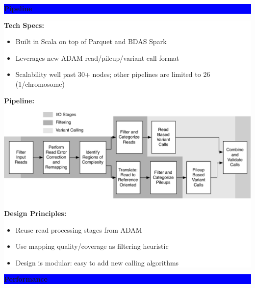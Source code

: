 \documentclass[11pt]{a0poster}
\begin{document}
{\begin{minipage}[t][2045pt][t]{\linewidth}
\begin{minipage}{0.3\linewidth}
\vspace{75pt}
\colorbox{Blue}{
\begin{minipage}{\linewidth}
\vspace{25pt}
\begin{center}
\Huge \bf \color{White} Pipeline
\end{center}
\vspace{10pt}
\end{minipage}
}
\colorbox{White}{
\begin{minipage}[t][1020pt][t]{\linewidth}
\color{Blue}
\vspace{20pt}
\LARGE
\textbf{Tech Specs:}
\begin{itemize}
\item Built in Scala on top of Parquet and BDAS Spark
\item Leverages new ADAM read/pileup/variant call format
\item Scalability well past 30+ nodes; other pipelines are limited to 26 (1/chromosome)
\end{itemize}
\textbf{Pipeline:} \\
\begin{center}
\includegraphics[width=0.9\linewidth]{avocado-architecture.pdf}
\end{center} 
\textbf{Design Principles:}
\begin{itemize}
\item Reuse read processing stages from ADAM
\item Use mapping quality/coverage as filtering heuristic
\item Design is modular: easy to add new calling algorithms
\end{itemize}
\pagebreak
\end{minipage}
}
\pagebreak
\end{minipage}
\begin{minipage}{0.03\linewidth}
\hfill
\pagebreak
\end{minipage}
\begin{minipage}{0.6\linewidth}

\vspace{70pt}
\colorbox{Blue}{
\begin{minipage}[t]{\linewidth}
\vspace{30pt}
\begin{center}
\Huge \bf \color{White} Performance
\end{center}
\vspace{17pt}
\end{minipage}
}
\colorbox{White}{
\begin{minipage}[t][500pt][t]{\linewidth}
\hfill
\pagebreak
\end{minipage}
}


\end{minipage}
\end{minipage}}
\end{document}
